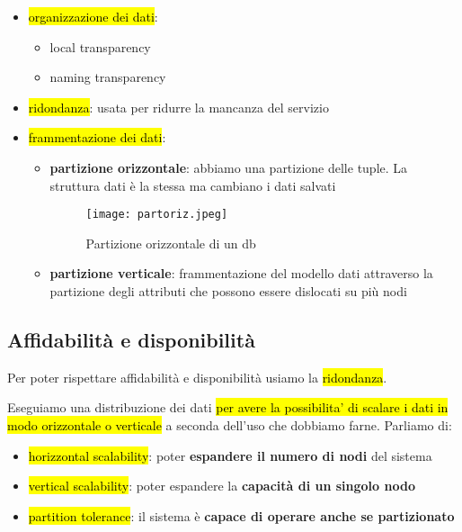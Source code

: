 \begin{itemize}
    \item \hl{organizzazione dei dati}:

        \begin{itemize}
            \item local transparency
            \item naming transparency
        \end{itemize}
    
    \item \hl{ridondanza}: usata per ridurre la mancanza del servizio
    
    \item \hl{frammentazione dei dati}:

        \begin{itemize}
            \item \textbf{partizione orizzontale}: abbiamo una partizione delle tuple. La struttura dati è la stessa ma cambiano i dati salvati
            
            \begin{figure}[H]
            \centering
            \texttt{[image: partoriz.jpeg]}
            \caption{Partizione orizzontale di un db} 
            \label{partoriz}
            \end{figure}

            \item \textbf{partizione verticale}: frammentazione del modello dati attraverso la partizione degli attributi che possono essere dislocati su più nodi
        \end{itemize}
    
\end{itemize}


\subsection{Affidabilità e disponibilità}

Per poter rispettare affidabilità e disponibilità usiamo la \hl{ridondanza}.

Eseguiamo una distribuzione dei dati \hl{per avere la possibilita' di scalare i dati in modo orizzontale o verticale} a seconda dell'uso che dobbiamo farne. Parliamo di:

\begin{itemize}
    \item \hl{horizzontal scalability}: poter \textbf{espandere il numero di nodi} del sistema
    \item \hl{vertical scalability}: poter espandere la \textbf{capacità di un singolo nodo}
    \item \hl{partition tolerance}: il sistema è \textbf{capace di operare anche se partizionato}
\end{itemize}


